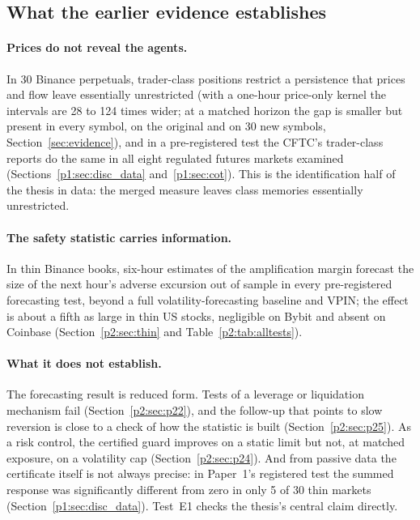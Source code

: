 \subsection{What the earlier evidence establishes}\label{sec:ev_existing}

\paragraph{Prices do not reveal the agents.} In 30 Binance perpetuals, trader-class positions restrict a persistence that prices and flow leave essentially unrestricted (with a one-hour price-only kernel the intervals are 28 to 124 times wider; at a matched horizon the gap is smaller but present in every symbol, on the original and on 30 new symbols, Section~\ref{sec:evidence}), and in a pre-registered test the CFTC's trader-class reports do the same in all eight regulated futures markets examined (Sections~\ref{p1:sec:disc_data} and~\ref{p1:sec:cot}). This is the identification half of the thesis in data: the merged measure leaves class memories essentially unrestricted.

\paragraph{The safety statistic carries information.} In thin Binance books, six-hour estimates of the amplification margin forecast the size of the next hour's adverse excursion out of sample in every pre-registered forecasting test, beyond a full volatility-forecasting baseline and VPIN; the effect is about a fifth as large in thin US stocks, negligible on Bybit and absent on Coinbase (Section~\ref{p2:sec:thin} and Table~\ref{p2:tab:alltests}).

\paragraph{What it does not establish.} The forecasting result is reduced form. Tests of a leverage or liquidation mechanism fail (Section~\ref{p2:sec:p22}), and the follow-up that points to slow reversion is close to a check of how the statistic is built (Section~\ref{p2:sec:p25}). As a risk control, the certified guard improves on a static limit but not, at matched exposure, on a volatility cap (Section~\ref{p2:sec:p24}). And from passive data the certificate itself is not always precise: in Paper~1's registered test the summed response was significantly different from zero in only 5 of 30 thin markets (Section~\ref{p1:sec:disc_data}). Test~E1 checks the thesis's central claim directly.

